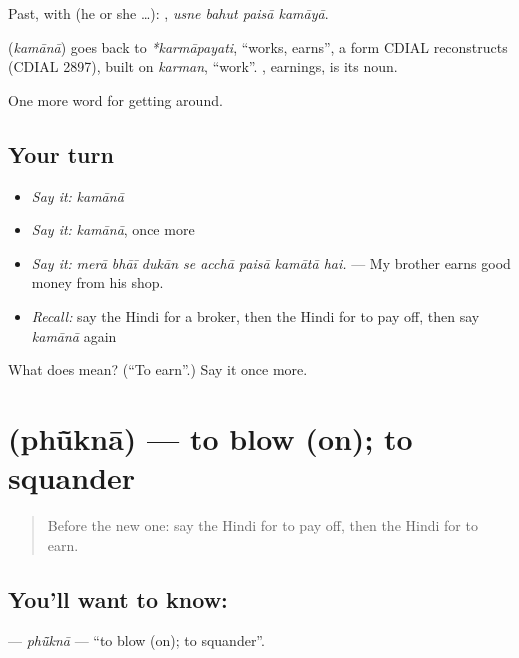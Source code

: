 Past, with  (he or she …):    , \emph{usne bahut paisā kamāyā}.

\begin{cousinweb}
\textbf{} (\emph{kamānā}) goes back to \emph{*karmāpayati}, \textquotedblleft{}works, earns\textquotedblright{}, a form CDIAL reconstructs (CDIAL 2897), built on \emph{karman}, \textquotedblleft{}work\textquotedblright{}. , earnings, is its noun.
\end{cousinweb}

\begin{grammarlens}[title={What you've built}]
One more word for getting around.
\end{grammarlens}

\subsection*{Your turn}
\begin{itemize}
\raggedright
  \item \emph{Say it:} \emph{kamānā}
  \item \emph{Say it:} \emph{kamānā}, once more
  \item \emph{Say it:} \emph{merā bhāī dukān se acchā paisā kamātā hai.} — My brother earns good money from his shop.
  \item \emph{Recall:} say the Hindi for a broker, then the Hindi for to pay off, then say \emph{kamānā} again
\end{itemize}

\begin{tcolorbox}[breakable,colback=teal!4,colframe=teal!35!black,title={Before you move on}]
What does  mean? (\textquotedblleft{}To earn\textquotedblright{}.) Say it once more.
\end{tcolorbox}
\section[\texorpdfstring{\hi{फूँकना} (phū̃knā)}{फूँकना (phū̃knā)}]{ (phū̃knā) — to blow (on); to squander}

\label{lesson:HI-C428-phukna}



\begin{quote}
Before the new one: say the Hindi for to pay off, then the Hindi for to earn.
\end{quote}

\subsection*{You'll want to know: }
\textbf{} — \emph{phū̃knā} — \textquotedblleft{}to blow (on); to squander\textquotedblright{}.

